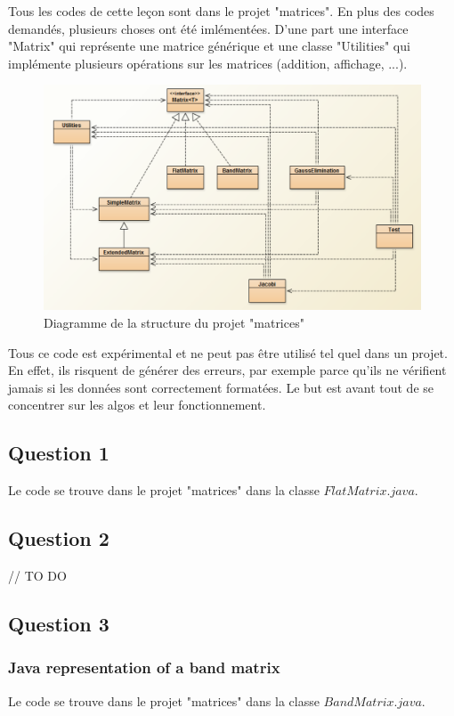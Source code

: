 Tous les codes de cette leçon sont dans le projet "matrices". En plus des codes demandés, plusieurs choses ont été imlémentées. D'une part une interface "Matrix" qui représente une matrice générique et une classe "Utilities" qui implémente plusieurs opérations sur les matrices (addition, affichage, ...).

\begin{figure}[H]
	\caption{\label{struc} Diagramme de la structure du projet "matrices"}
	\centering
	\includegraphics[scale = 0.6]{2_structure.png}
\end{figure}

Tous ce code est expérimental et ne peut pas être utilisé tel quel dans un projet. En effet, ils risquent de générer des erreurs, par exemple parce qu'ils ne vérifient jamais si les données sont correctement formatées. Le but est avant tout de se concentrer sur les algos et leur fonctionnement.

\subsection{Question 1}
Le code se trouve dans le projet "matrices" dans la classe $FlatMatrix.java$.


\subsection{Question 2}

// TO DO

\subsection{Question 3}

\subsubsection{Java representation of a band matrix}
Le code se trouve dans le projet "matrices" dans la classe $BandMatrix.java$.


